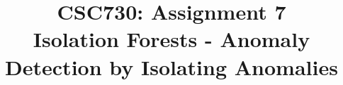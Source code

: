 \documentclass[conference]{IEEEtran}
\begin{document}
\title{CSC730: Assignment 7\\Isolation Forests - Anomaly Detection by Isolating Anomalies}

\maketitle




\printbibliography{}
\vspace{12pt}
\end{document}
